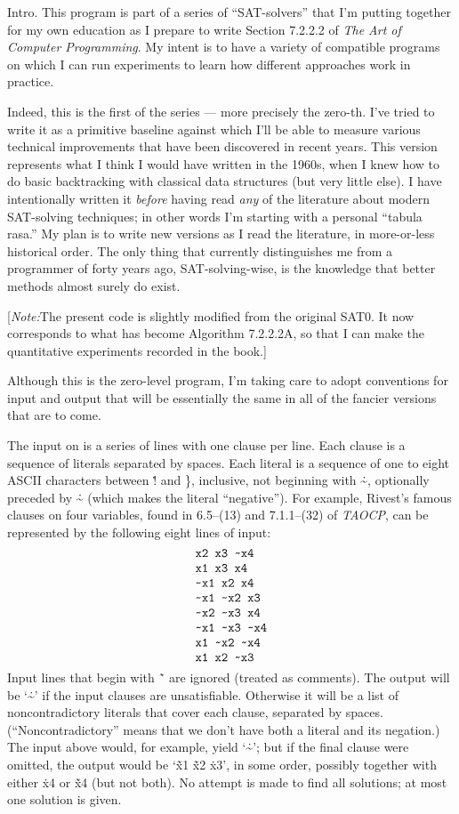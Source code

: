 
\hypertextrue\srcloctrue
\datethis

Intro. This program is part of a series of ``SAT-solvers''
that I'm putting
together for my own education as I prepare to write Section 7.2.2.2 of
{\sl The Art of Computer Programming}. My intent is to have a variety of
compatible programs on which I can run experiments to learn how different
approaches work in practice.

Indeed, this is the first of the series --- more precisely the zero-th. I've
tried to write it as a primitive baseline against which I'll be able to measure
various technical improvements that have been discovered in recent years.
This version represents what I think I would have written in the 1960s,
when I knew how to do basic backtracking with classical data structures
(but very little else). I have intentionally written it {\it before\/} having
read {\it any\/} of the literature about modern SAT-solving techniques;
in other words I'm starting with a personal ``tabula rasa.''
My plan is to write new versions as I read the literature, in more-or-less
historical order. The only thing that currently distinguishes me from a
programmer of forty years ago, SAT-solving-wise, is the knowledge that better
methods almost surely do exist.

[{\it Note:}\enspace The present code is slightly modified from the
original {\mc SAT0}. It now corresponds to what has become
Algorithm 7.2.2.2A, so that I can make the quantitative experiments
recorded in the book.]

Although this is the zero-level program, I'm taking care to adopt conventions
for input and output that will be essentially the same in all of the
fancier versions that are to come.

The input on  is a series of lines with one clause per line. Each
clause is a sequence of literals separated by spaces. Each literal is
a sequence of one to eight ASCII characters between \.{!} and \.{\}},
inclusive, not beginning with \.{\~},
optionally preceded by \.{\~} (which makes the literal ``negative'').
For example, Rivest's famous clauses on four variables,
found in 6.5--(13) and 7.1.1--(32) of {\sl TAOCP}, can be represented by the
following eight lines of input:
$$\chardef~=`\~
\vcenter{\halign{\tt#\cr
x2 x3 ~x4\cr
x1 x3 x4\cr
~x1 x2 x4\cr
~x1 ~x2 x3\cr
~x2 ~x3 x4\cr
~x1 ~x3 ~x4\cr
x1 ~x2 ~x4\cr
x1 x2 ~x3\cr}}$$
Input lines that begin with \.{\~\ } are ignored (treated as comments).
The output will be `\.{\~}' if the input clauses are unsatisfiable.
Otherwise it will be a list of noncontradictory literals that cover each
clause, separated by spaces. (``Noncontradictory'' means that we don't
have both a literal and its negation.) The input above would, for example,
yield `\.{\~}'; but if the final clause were omitted, the output would
be `\.{\~x1} \.{\~x2} \.{x3}', in some order, possibly together
with either \.{x4} or \.{\~x4} (but not both). No attempt is made to
find all solutions; at most one solution is given.

